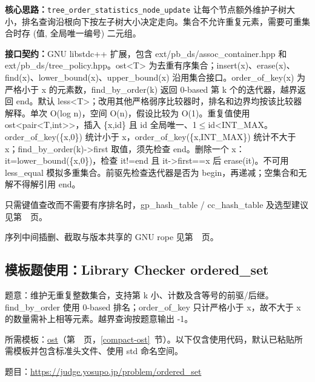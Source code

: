 \textbf{核心思路：}\allowbreak \texttt{tree\_order\_statistics\_node\_update} 让每个节点额外维护子树大小，排名查询沿根向下按左子树大小决定走向。集合不允许重复元素，需要可重集合时存 (值, 全局唯一编号) 二元组。



{\sloppy{}\noindent\textbf{接口契约：}GNU libstdc++ 扩展，包含 ext/pb\_ds/assoc\_container.hpp 和 ext/pb\_ds/tree\_policy.hpp。ost<T> 为去重有序集合；insert(x)、erase(x)、find(x)、lower\_bound(x)、upper\_bound(x) 沿用集合接口。order\_of\_key(x) 为严格小于 x 的元素数，find\_by\_order(k) 返回 0-based 第 k 个的迭代器，越界返回 end。默认 less<T>；改用其他严格弱序比较器时，排名和边界均按该比较器解释。单次 O(log n)，空间 O(n)，假设比较为 O(1)。重复值使用 ost<pair<T,int>>，插入 \{x,id\} 且 id 全局唯一、1$\le$id<INT\_MAX。order\_of\_key(\{x,0\}) 统计小于 x，order\_of\_key(\{x,INT\_MAX\}) 统计不大于 x；find\_by\_order(k)->first 取值，须先检查 end。删除一个 x：it=lower\_bound(\{x,0\})，检查 it!=end 且 it->first==x 后 erase(it)。不可用 less\_equal 模拟多重集合。前驱先检查迭代器是否为 begin，再递减；空集合和无解不得解引用 end。\par}

只需键值查改而不需要有序排名时，gp\_hash\_table / cc\_hash\_table 及选型建议见第~\pageref{compact-gp_map}~页。

序列中间插删、截取与版本共享的 GNU rope 见第~\pageref{compact-rp}~页。



\Needspace{573pt}

\subsection*{模板题使用：Library Checker ordered\_set}

\label{usage-example-67}

题意：维护无重复整数集合，支持第 k 小、计数及含等号的前驱/后继。find\_by\_order 使用 0-based 排名；order\_of\_key 只计严格小于 x，故不大于 x 的数量需补上相等元素。越界查询按题意输出 -1。

所需模板：\hyperref[compact-ost]{ost}（第~\pageref{compact-ost}~页，\ref{compact-ost}~节）。以下仅含使用代码，默认已粘贴所需模板并包含标准头文件、使用 std 命名空间。

题目：\url{https://judge.yosupo.jp/problem/ordered_set}



\Needspace{295pt}

